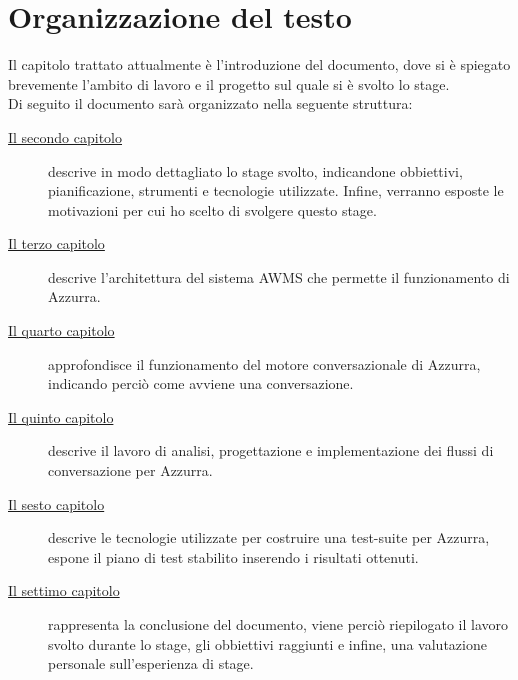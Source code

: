 \section{Organizzazione del testo}
Il capitolo trattato attualmente è l'introduzione del documento, dove si è spiegato brevemente l'ambito di lavoro e il progetto sul quale si è svolto lo stage.\\
Di seguito il documento sarà organizzato nella seguente struttura:
\begin{description}
    
    \item[{\hyperref[cap:descrizione-stage]{Il secondo capitolo}}] descrive in modo dettagliato lo stage svolto, indicandone obbiettivi, pianificazione, strumenti e tecnologie utilizzate. Infine, verranno esposte le motivazioni per cui ho scelto di svolgere questo stage.
    
    \item[{\hyperref[cap:archittettura del sistema AWMS]{Il terzo capitolo}}] descrive l'architettura del sistema \gls{AWMS} che permette il funzionamento di Azzurra.
    
    \item[{\hyperref[cap:flow engine]{Il quarto capitolo}}] approfondisce il funzionamento del motore conversazionale di Azzurra, indicando perciò come avviene una conversazione.
    
    \item[{\hyperref[cap:flussi di conversazione]{Il quinto capitolo}}] descrive il lavoro di analisi, progettazione e implementazione dei flussi di conversazione per Azzurra.
    
    \item[{\hyperref[cap:test]{Il sesto capitolo}}] descrive le tecnologie utilizzate per costruire una test-suite per Azzurra, espone il piano di test stabilito inserendo i risultati ottenuti.
    
    \item[{\hyperref[cap:conclusioni]{Il settimo capitolo}}] rappresenta la conclusione del documento, viene perciò riepilogato il lavoro svolto durante lo stage, gli obbiettivi raggiunti e infine, una valutazione personale sull'esperienza di stage.
\end{description}
